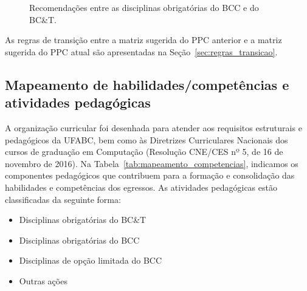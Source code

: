 \begin{figure}
    \centering
    \resizebox{\textwidth}{!}{}
    \caption{Recomendações entre as disciplinas obrigatórias do BCC e do BC\&T.}
    \label{fig:recomendacoes}
\end{figure}

As regras de transição entre a matriz sugerida do PPC anterior e a matriz
sugerida do PPC atual são apresentadas na Seção~\ref{sec:regras_transicao}.

\subsection{Mapeamento de habilidades/competências e atividades pedagógicas}

A organização curricular foi desenhada para atender aos requisitos estruturais
e pedagógicos da UFABC, bem como às Diretrizes Curriculares Nacionais dos
cursos de graduação em Computação (Resolução CNE/CES nº 5, de 16 de novembro de
2016).
Na Tabela~\ref{tab:mapeamento_competencias}, indicamos os componentes
pedagógicos que contribuem para a formação e consolidação das habilidades e
competências dos egressos.
As atividades pedagógicas estão classificadas da seguinte forma:

\begin{itemize}
    \item \textcolor{nred}{Disciplinas obrigatórias do BC\&T}
    \item \textcolor{nblue}{Disciplinas obrigatórias do BCC}
    \item \textcolor{nyellow}{Disciplinas de opção limitada do BCC}
    \item \textcolor{npurple}{Outras ações}
\end{itemize}


